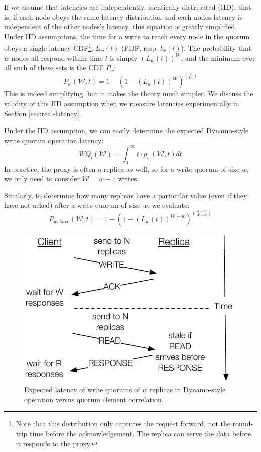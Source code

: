 \documentclass{vldb}
\begin{document}
If we assume that latencies are independently, identically distributed
(IID), that is, if each node obeys the same latency distribution and
each nodes latency is independent of the other nodes's latency, this
equation is greatly simplified.  Under IID assumptions, the time for a
write to reach every node in the quorum obeys a single latency
CDF\footnote{Note that this distribution only captures the request
  forward, not the round-trip time before the acknowledgement.  The
  replica can serve the data before it responds to the proxy.},
$L_w(t)$ (PDF, resp. $l_w(t)$).  The probability that $w$ nodes all
respond within time $t$ is simply $(L_w(t))^\mathcal{W}$, and the
minimum over all such of these sets is the CDF $P_w$:
\begin{equation}
P_w(\mathcal{W}, t) = 1-(1-(L_w(t))^\mathcal{W})^{n \choose \mathcal{W}}
\end{equation}
This is indeed simplifying, but it makes the theory much simpler.  We
discuss the validity of this IID assumption when we measure latencies
experimentally in Section \ref{sec:real-latency}.

Under the IID assumption, we can easily determine the expected
Dynamo-style write quorum operation latency:
\begin{equation}
WQ_l(\mathcal{W}) = \int_0^{\infty} t \cdot p_w(\mathcal{W}, t) dt
\end{equation}
In practice, the proxy is often a replica as well, so for a write
quorum of size $w$, we only need to consider $\mathcal{W}=w-1$ writes.

Similarly, to determine how many replicas have a particular value (even if they have not acked) after a write quorum of size $w$, we evaluate:
\begin{equation}
P_{w:have}(\mathcal{W}, t) = 1-(1-(L_w(t))^{\mathcal{W}-w})^{n-w \choose \mathcal{W}-w}
\end{equation}

\begin{figure}
\centering
\includegraphics[width=.8\columnwidth]{figs/dynamostale.pdf}
\caption{Expected latency of write quorums of $w$ replicas in Dynamo-style operation versus quorum element correlation.}
\label{fig:dynamostale}
\end{figure}
\end{document}
